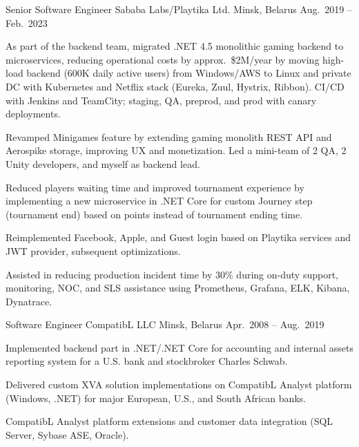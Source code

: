 \begin{cventries}
  \cventry
    {Senior Software Engineer} %
    {Sababa Labs/Playtika Ltd.} %
    {Minsk, Belarus} %
    {Aug.\ 2019 -- Feb.\ 2023} %
    {
      \begin{cvitems} %
        \item {As part of the backend team, migrated .NET 4.5 monolithic gaming backend to microservices, reducing operational costs by approx.\ \$2M/year by moving high-load backend (600K daily active users) from Windows/AWS to Linux and private DC with Kubernetes and Netflix stack (Eureka, Zuul, Hystrix, Ribbon). CI/CD with Jenkins and TeamCity; staging, QA, preprod, and prod with canary deployments.}
        \item {Revamped Minigames feature by extending gaming monolith REST API and Aerospike storage, improving UX and monetization. Led a mini-team of 2 QA, 2 Unity developers, and myself as backend lead.}
        \item {Reduced players waiting time and improved tournament experience by implementing a new microservice in .NET Core for custom Journey step (tournament end) based on points instead of tournament ending time.}
        \item {Reimplemented Facebook, Apple, and Guest login based on Playtika services and JWT provider, subsequent optimizations.}
        \item {Assisted in reducing production incident time by 30\% during on-duty support, monitoring, NOC, and SLS assistance using Prometheus, Grafana, ELK, Kibana, Dynatrace.}
      \end{cvitems}
    }

  \cventry
    {Software Engineer} %
    {CompatibL LLC} %
    {Minsk, Belarus} %
    {Apr.\ 2008 -- Aug.\ 2019} %
    {
      \begin{cvitems} %
        \item {Implemented backend part in .NET/.NET Core for accounting and internal assets reporting system for a U.S. bank and stockbroker Charles Schwab.}
        \item {Delivered custom XVA solution implementations on CompatibL Analyst platform (Windows, .NET) for major European, U.S., and South African banks.}
        \item {CompatibL Analyst platform extensions and customer data integration (SQL Server, Sybase ASE, Oracle).}  
      \end{cvitems}
    }


\end{cventries}
